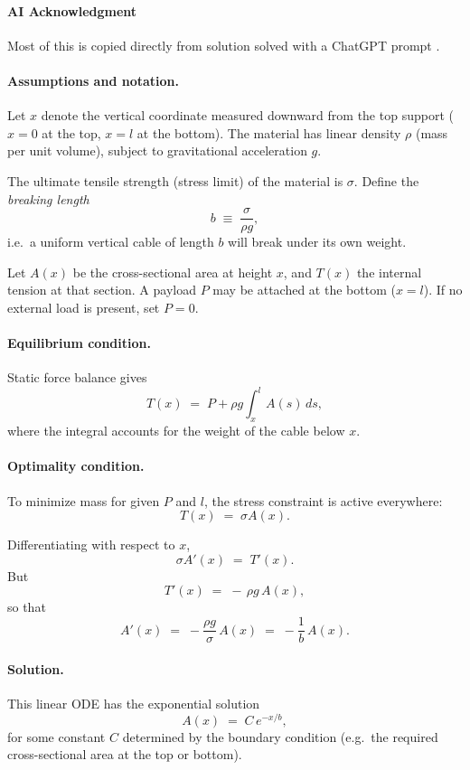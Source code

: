 \documentclass{article}
\begin{document}
\paragraph{AI Acknowledgment}
Most of this is copied directly from solution solved with a ChatGPT prompt \cite{chatgpt}.

\paragraph{Assumptions and notation.}  
Let $x$ denote the vertical coordinate measured downward from the top support ($x=0$ at the top, $x=l$ at the bottom).  
The material has linear density $\rho$ (mass per unit volume), subject to gravitational acceleration $g$.  

The ultimate tensile strength (stress limit) of the material is $\sigma$.  
Define the \emph{breaking length}
\[
b \;\equiv\; \frac{\sigma}{\rho g},
\]
i.e.\ a uniform vertical cable of length $b$ will break under its own weight.  

Let $A(x)$ be the cross-sectional area at height $x$, and $T(x)$ the internal tension at that section.  
A payload $P$ may be attached at the bottom ($x=l$). If no external load is present, set $P=0$.  

\paragraph{Equilibrium condition.}  
Static force balance gives
\[
T(x) \;=\; P + \rho g \int_x^l A(s)\,ds,
\]
where the integral accounts for the weight of the cable below $x$.  

\paragraph{Optimality condition.}  
To minimize mass for given $P$ and $l$, the stress constraint is active everywhere:
\[
T(x) \;=\; \sigma A(x).
\]

Differentiating with respect to $x$,
\[
\sigma A'(x) \;=\; T'(x).
\]
But
\[
T'(x) \;=\; -\,\rho g\, A(x),
\]
so that
\[
A'(x) \;=\; -\frac{\rho g}{\sigma}\, A(x) \;=\; -\frac{1}{b}\,A(x).
\]

\paragraph{Solution.}  
This linear ODE has the exponential solution
\[
A(x) \;=\; C\, e^{-x/b},
\]
for some constant $C$ determined by the boundary condition (e.g.\ the required cross-sectional area at the top or bottom).
\end{document}
